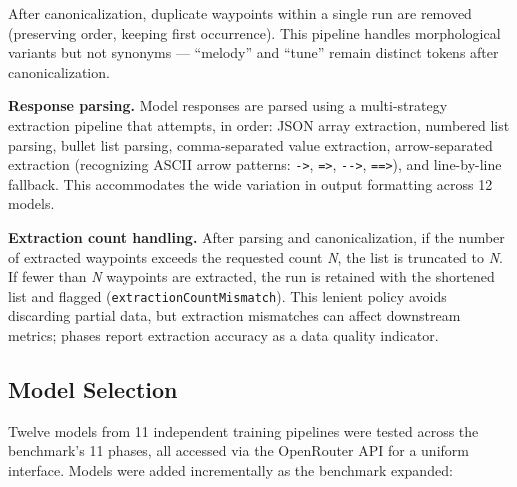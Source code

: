 After canonicalization, duplicate waypoints within a single run are removed (preserving order, keeping first occurrence). This pipeline handles morphological variants but not synonyms --- ``melody'' and ``tune'' remain distinct tokens after canonicalization.

\textbf{Response parsing.} Model responses are parsed using a multi-strategy extraction pipeline that attempts, in order: JSON array extraction, numbered list parsing, bullet list parsing, comma-separated value extraction, arrow-separated extraction (recognizing ASCII arrow patterns: \texttt{-\textgreater{}}, \texttt{=\textgreater{}}, \texttt{-\/-\textgreater{}}, \texttt{==\textgreater{}}), and line-by-line fallback. This accommodates the wide variation in output formatting across 12 models.

\textbf{Extraction count handling.} After parsing and canonicalization, if the number of extracted waypoints exceeds the requested count \emph{N}, the list is truncated to \emph{N}. If fewer than \emph{N} waypoints are extracted, the run is retained with the shortened list and flagged (\texttt{extractionCountMismatch}). This lenient policy avoids discarding partial data, but extraction mismatches can affect downstream metrics; phases report extraction accuracy as a data quality indicator.

\subsection{Model Selection}\label{model-selection}

Twelve models from 11 independent training pipelines were tested across the benchmark's 11 phases, all accessed via the OpenRouter API for a uniform interface. Models were added incrementally as the benchmark expanded:

